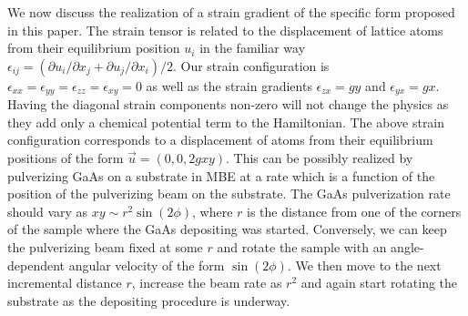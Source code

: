 \documentclass[prl,aps,amssymb,shownopacs,twocolumn]{revtex4}
\begin{document}
	We now discuss the realization of a strain gradient of the
	specific form proposed in this paper. The strain tensor is related
	to the displacement of lattice atoms from their equilibrium
	position $u_i$ in the familiar way $\epsilon_{ij} = (\partial u_i
	/\partial x_j +
	\partial u_j /\partial x_i)/2$. Our strain configuration is
	$\epsilon_{xx} =\epsilon_{yy} = \epsilon_{zz} = \epsilon_{xy}=0$ as
	well as the strain gradients $\epsilon_{zx} = g y$ and
	$\epsilon_{yx} = g x$. Having the diagonal strain components
	non-zero will not change the physics as they add only a chemical
	potential term to the Hamiltonian. The above strain configuration
	corresponds to a displacement of atoms from their equilibrium
	positions of the form $\vec{u} = (0,0, 2 g x y)$. This can be
	possibly realized by pulverizing GaAs on a substrate in MBE at a
	rate which is a function of the position of the pulverizing beam on
	the substrate. The GaAs pulverization rate should vary as $xy \sim
	r^2 \sin(2\phi)$, where $r$ is the distance from one of the corners
	of the sample where the GaAs depositing was started. Conversely, we
	can keep the pulverizing beam fixed at some $r$ and rotate the
	sample with an angle-dependent angular velocity of the form $\sin(2
	\phi)$. We then move to the next incremental distance $r$, increase
	the beam rate as $r^2$ and again start rotating the substrate as the
	depositing procedure is underway.
	
	
	
\end{document}
